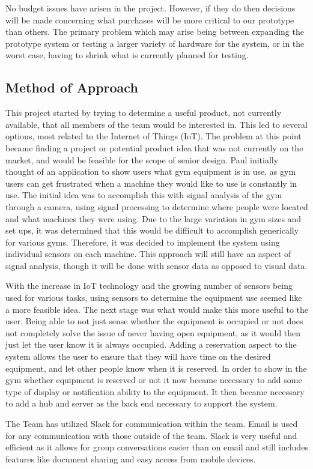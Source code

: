\documentclass[PPFS.tex]{template/subfiles}
\begin{document}
    No budget issues have arisen in the project. However, if they do then decisions will be made concerning what purchases will be more critical to our prototype than others. The primary problem which may arise being between expanding the prototype system or testing a larger variety of hardware for the system, or in the worst case, having to shrink what is currently planned for testing.  
	
	\subsection{Method of Approach}
	This project started by trying to determine a useful product, not currently available, that all members of the team would be interested in. This led to several options, most related to the Internet of Things (IoT). The problem at this point became finding a project or potential product idea that was not currently on the market, and would be feasible for the scope of senior design. Paul initially thought of an application to show users what gym equipment is in use, as gym users can get frustrated when a machine they would like to use is constantly in use. The initial idea was to accomplish this with signal analysis of the gym through a camera, using signal processing to determine where people were located and what machines they were using. Due to the large variation in gym sizes and set ups, it was determined that this would be difficult to accomplish generically for various gyms. Therefore, it was decided to implement the system using individual sensors on each machine. This approach will still have an aspect of signal analysis, though it will be done with sensor data as opposed to visual data.  
	
	With the increase in IoT technology and the growing number of sensors being used for various tasks, using sensors to determine the equipment use seemed like a more feasible idea. The next stage was what would make this more useful to the user. Being able to not just sense whether the equipment is occupied or not does not completely solve the issue of never having open equipment, as it would then just let the user know it is always occupied. Adding a reservation aspect to the system allows the user to ensure that they will have time on the desired equipment, and let other people know when it is reserved. In order to show in the gym whether equipment is reserved or not it now became necessary to add some type of display or notification ability to the equipment. It then became necessary to add a hub and server as the back end necessary to support the system.
	
	The Team has utilized Slack for communication within the team. Email is used for any communication with those outside of the team. Slack is very useful and efficient as it allows for group conversations easier than on email and still includes features like document sharing and easy access from mobile devices. 
	
\end{document}
